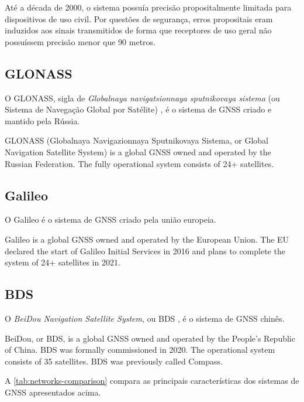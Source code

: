 Até a década de 2000, o sistema possuía precisão propositalmente limitada para dispositivos de uso civil. Por questões de segurança, erros propositais eram induzidos aos sinais transmitidos de forma que receptores de uso geral não possuíssem precisão menor que 90 metros.


\subsection{GLONASS}

O GLONASS, sigla de \textit{Globalnaya navigatsionnaya sputnikovaya sistema} (ou Sistema de Navegação Global por Satélite) \cite{glonass}, é o sistema de GNSS criado e mantido pela Rússia.

GLONASS (Globalnaya Navigazionnaya Sputnikovaya Sistema, or Global Navigation Satellite System) is a global GNSS owned and operated by the Russian Federation. The fully operational system consists of 24+ satellites.

\subsection{Galileo}

O Galileo é o sistema de GNSS criado pela união europeia.

Galileo is a global GNSS owned and operated by the European Union. The EU declared the start of Galileo Initial Services in 2016 and plans to complete the system of 24+ satellites in 2021.

\subsection{BDS}

O \textit{BeiDou Navigation Satellite System}, ou BDS \cite{beidou}, é o sistema de GNSS chinês.

BeiDou, or BDS, is a global GNSS owned and operated by the People's Republic of China. BDS was formally commissioned in 2020. The operational system consists of 35 satellites. BDS was previously called Compass.



A \autoref{tab:networks-comparison} compara as principais características dos sistemas de GNSS apresentados acima.

